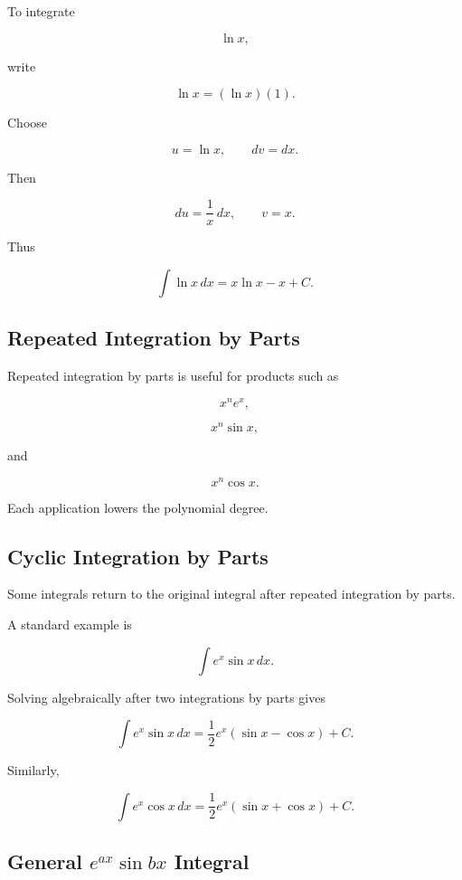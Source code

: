 To integrate

\[
\ln x,
\]

write

\[
\ln x
=
(\ln x)(1).
\]

Choose

\[
u=\ln x,
\qquad
dv=dx.
\]

Then

\[
du=\frac1x\,dx,
\qquad
v=x.
\]

Thus

\[
\boxed{
\int\ln x\,dx
=
x\ln x-x+C.
}
\]

\subsection{Repeated Integration by Parts}
\label{subsec:repeated-integration-by-parts}

Repeated integration by parts is useful for products such as

\[
x^n e^x,
\]

\[
x^n\sin x,
\]

and

\[
x^n\cos x.
\]

Each application lowers the polynomial degree.

\subsection{Cyclic Integration by Parts}
\label{subsec:cyclic-integration-by-parts}

Some integrals return to the original integral after repeated integration by
parts.

A standard example is

\[
\int e^x\sin x\,dx.
\]

Solving algebraically after two integrations by parts gives

\[
\boxed{
\int e^x\sin x\,dx
=
\frac12
e^x
(\sin x-\cos x)
+
C.
}
\]

Similarly,

\[
\boxed{
\int e^x\cos x\,dx
=
\frac12
e^x
(\sin x+\cos x)
+
C.
}
\]

\subsection{General \(e^{ax}\sin bx\) Integral}
\label{subsec:general-exp-sine-integral}

